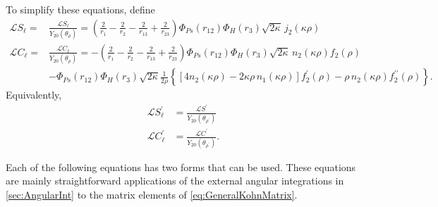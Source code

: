 \documentclass[Dissertation.tex]{subfiles}
\begin{document}
To simplify these equations, define
\begin{align}
\nonumber \mathscr{L} S_\ell = &\frac{\mathcal{L} S_\ell}{Y_{20}(\theta_\rho)} = \left(\frac{2}{r_1} - \frac{2}{r_2} - \frac{2}{r_{13}} + \frac{2}{r_{23}} \right) \Phi_{Ps}(r_{12}) \Phi_H(r_3) \sqrt{2\kappa} \, j_2(\kappa\rho) \\
\nonumber \mathscr{L} C_\ell = &\frac{\mathcal{L} C_\ell}{Y_{20}(\theta_\rho)} = - \left(\frac{2}{r_1} - \frac{2}{r_2} - \frac{2}{r_{13}} + \frac{2}{r_{23}} \right) \Phi_{Ps}(r_{12}) \Phi_H(r_3) \sqrt{2\kappa} \, n_2(\kappa\rho) f_{2}(\rho) \\
& - \Phi_{Ps}(r_{12}) \Phi_H(r_3) \sqrt{2\kappa} \frac{1}{2\rho} \left\{ \left[4 n_2(\kappa\rho) - 2 \kappa\rho \, n_1(\kappa\rho) \right] f_{2}^\prime(\rho) - \rho \, n_2(\kappa\rho) f_{2}^{\prime\prime}(\rho) \right\}.
\end{align}
Equivalently,
\begin{subequations}
\begin{align}
\mathscr{L} S_\ell^\prime &= \frac{\mathcal{L} S^\prime}{Y_{20}(\theta_{\rho^\prime})} \\
\mathscr{L} C_\ell^\prime &= \frac{\mathcal{L} C^\prime}{Y_{20}(\theta_{\rho^\prime})}.
\end{align}
\end{subequations}

Each of the following equations has two forms that can be used. These 
equations are mainly straightforward applications of the external angular
integrations in \cref{sec:AngularInt} to the matrix elements of
\cref{eq:GeneralKohnMatrix}.

\end{document}
